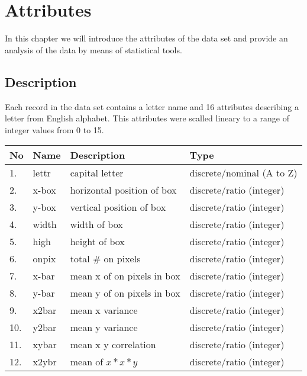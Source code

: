 \chapter*{Attributes}
In this chapter we will introduce the attributes of the data set and provide an
analysis of the data by means of statistical tools.

\section*{Description}
\setcounter{chapter}{1}
Each record in the data set contains a letter name and 16 attributes describing
a letter from English alphabet. This attributes were scalled lineary to a range
of integer values from 0 to 15.

\begin{table}[ht!]
    \centering
    \begin{tabular}{|l|l|l|l|}
         \hline
             No & Name & Description & Type \\ \hline
             1. & lettr & capital letter             & discrete/nominal (A to Z)  \\ \hline
             2. & x-box & horizontal position of box & discrete/ratio (integer)   \\ \hline
             3. & y-box & vertical position of box   & discrete/ratio (integer)   \\ \hline
             4. & width & width of box               & discrete/ratio (integer)   \\ \hline
             5. & high  & height of box              & discrete/ratio (integer)   \\ \hline
             6. & onpix & total \# on pixels         & discrete/ratio (integer)   \\ \hline
             7. & x-bar & mean x of on pixels in box & discrete/ratio (integer)   \\ \hline
             8. & y-bar & mean y of on pixels in box & discrete/ratio (integer)   \\ \hline
             9. & x2bar & mean x variance            & discrete/ratio (integer)   \\ \hline
            10. & y2bar & mean y variance            & discrete/ratio (integer)   \\ \hline
            11. & xybar & mean x y correlation       & discrete/ratio (integer)   \\ \hline
            12. & x2ybr & mean of $x * x * y$        & discrete/ratio (integer)   \\ \hline

\end{tabular}
\end{table}

